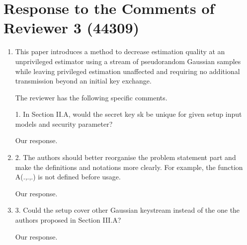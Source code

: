 \documentclass[a4paper]{scrartcl}
\newenvironment{rebuttal}{\begin{enumerate}[label={\color{grey}\thesection.\arabic{enumi}},leftmargin=0pt,ref=\thesection.\arabic{enumi}]}{\end{enumerate}}
\newcommand{\reviewtext}[1]{{\color{nblue} #1}}
\begin{document}



\section*{Response to the Comments of Reviewer 3 (44309)}
\def\thesection{R3}
\begin{rebuttal}
\item \reviewtext{This paper introduces a method to decrease estimation quality at an unprivileged estimator using a stream of pseudorandom Gaussian samples while leaving privileged estimation unaffected and requiring no additional transmission beyond an initial key exchange.

The reviewer has the following specific comments.

1. In Section II.A, would the secret key sk be unique for given setup input models and security parameter?}

Our response.

\item \reviewtext{2. The authors should better reorganise the problem statement part and make the definitions and notations more clearly. For example, the function A(.,.,.) is not defined before usage.}

Our response.

\item \reviewtext{3. Could the setup cover other Gaussian keystream instead of the one the authors proposed in Section III.A?}

Our response.

\end{rebuttal}


\end{document}
